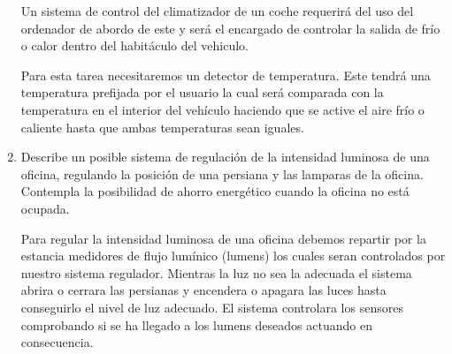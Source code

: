 \documentclass[10pt,a4paper,spanish]{article}
\begin{document}
\begin{enumerate}
    \noindent
    Un sistema de control del climatizador de un coche requerirá del uso del ordenador de abordo de este y será el encargado de controlar la salida de frío o calor dentro del habitáculo del vehiculo.

    \noindent
    Para esta tarea necesitaremos un detector de temperatura. Este tendrá una temperatura prefijada por el usuario la cual será comparada con la temperatura en el interior del vehículo haciendo que se active el aire frío o caliente hasta que ambas temperaturas sean iguales.

    \item Describe un posible sistema de regulación de la intensidad luminosa de una oficina, regulando la posición de una persiana y las lamparas de la oficina. Contempla la posibilidad de ahorro energético cuando la oficina no está ocupada.

    \noindent
    Para regular la intensidad luminosa de una oficina debemos repartir por la estancia medidores de flujo lumínico (lumens) los cuales seran controlados por nuestro sistema regulador. Mientras la luz no sea la adecuada el sistema abrira o cerrara las persianas y encendera o apagara las luces hasta conseguirlo el nivel de luz adecuado. El sistema controlara los sensores comprobando si se ha llegado a los lumens deseados actuando en consecuencia.

  \end{enumerate}
\end{document}
